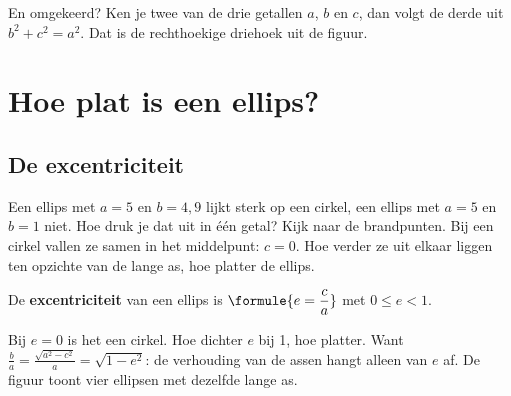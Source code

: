 
En omgekeerd? Ken je twee van de drie getallen $a$, $b$ en $c$, dan volgt de derde uit $b^2 + c^2 = a^2$. Dat is de rechthoekige driehoek uit de figuur.


\begin{oefeningen}
\end{oefeningen}

\section{Hoe plat is een ellips?}

\subsection{De excentriciteit}

Een ellips met $a = 5$ en $b = 4{,}9$ lijkt sterk op een cirkel, een ellips met $a = 5$ en $b = 1$ niet. Hoe druk je dat uit in één getal? Kijk naar de brandpunten. Bij een cirkel vallen ze samen in het middelpunt: $c = 0$. Hoe verder ze uit elkaar liggen ten opzichte van de lange as, hoe platter de ellips.

\begin{theorie}
De \textbf{\textcolor{accent}{excentriciteit}} van een ellips is \qquad $\formule{e = \dfrac ca}$ \qquad met $0 \leqslant e < 1$.
\end{theorie}

Bij $e = 0$ is het een cirkel. Hoe dichter $e$ bij 1, hoe platter. Want $\tfrac ba = \tfrac{\sqrt{a^2 - c^2}}{a} = \sqrt{1 - e^2}$: de verhouding van de assen hangt alleen van $e$ af. De figuur toont vier ellipsen met dezelfde lange as.

